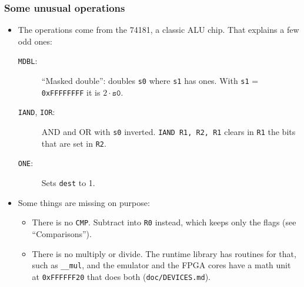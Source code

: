 \documentclass{beamer}
\newcommand{\code}[1]{\texttt{#1}}
\begin{document}
   \begin{frame}
    \frametitle{Some unusual operations}
    \begin{itemize}
     \item The operations come from the 74181, a classic ALU chip. That
      explains a few odd ones:
      \begin{description}
       \item [\code{MDBL}:] ``Masked double'': doubles \code{s0} where
        \code{s1} has ones. With \code{s1} = \code{0xFFFFFFFF} it is
        $2 \cdot \code{s0}$.
       \item [\code{IAND}, \code{IOR}:] AND and OR with \code{s0} inverted.
        \code{IAND R1, R2, R1} clears in \code{R1} the bits that are set
        in \code{R2}.
       \item [\code{ONE}:] Sets \code{dest} to 1.
      \end{description}
     \item Some things are missing on purpose:
      \begin{itemize}
       \item There is no \code{CMP}. Subtract into \code{R0} instead,
        which keeps only the flags (see ``Comparisons'').
       \item There is no multiply or divide. The runtime library has
        routines for that, such as \code{\_\_mul}, and the emulator and
        the FPGA cores have a math unit at \code{0xFFFFFF20} that does
        both (\code{doc/DEVICES.md}).
      \end{itemize}
    \end{itemize}
   \end{frame}
%
\end{document}
